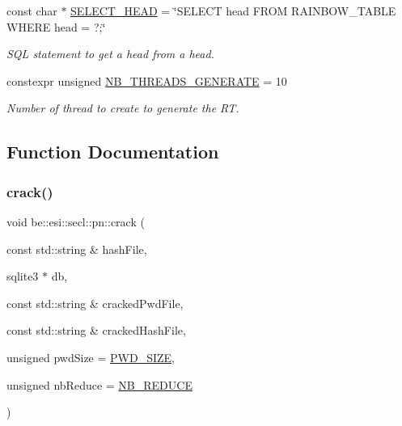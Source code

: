 \begin{DoxyCompactItemize}
const char $\ast$ \hyperlink{namespacebe_1_1esi_1_1secl_1_1pn_a90db4018123c098c9cd9205b69c1d2e5}{S\+E\+L\+E\+C\+T\+\_\+\+H\+E\+AD} = \char`\"{}S\+E\+L\+E\+CT head F\+R\+OM R\+A\+I\+N\+B\+O\+W\+\_\+\+T\+A\+B\+LE W\+H\+E\+RE head = ?;\char`\"{}
\begin{DoxyCompactList}\small\item\em S\+QL statement to get a head from a head. \end{DoxyCompactList}\item 
constexpr unsigned \hyperlink{namespacebe_1_1esi_1_1secl_1_1pn_a1e6f4ac9ec9002d783f3d7143062dcb5}{N\+B\+\_\+\+T\+H\+R\+E\+A\+D\+S\+\_\+\+G\+E\+N\+E\+R\+A\+TE} = 10
\begin{DoxyCompactList}\small\item\em Number of thread to create to generate the RT. \end{DoxyCompactList}\end{DoxyCompactItemize}


\subsection{Function Documentation}
\mbox{\label{namespacebe_1_1esi_1_1secl_1_1pn_a56fa00c405a4fb0e6446717fb1390493}} 
\subsubsection{\texorpdfstring{crack()}{crack()}}
{\footnotesize\ttfamily void be\+::esi\+::secl\+::pn\+::crack (\begin{DoxyParamCaption}\item[{const std\+::string \&}]{hash\+File,  }\item[{sqlite3 $\ast$}]{db,  }\item[{const std\+::string \&}]{cracked\+Pwd\+File,  }\item[{const std\+::string \&}]{cracked\+Hash\+File,  }\item[{unsigned}]{pwd\+Size = {\ttfamily \hyperlink{namespacebe_1_1esi_1_1secl_1_1pn_a233e474af3fb15b935a71709407307ec}{P\+W\+D\+\_\+\+S\+I\+ZE}},  }\item[{unsigned}]{nb\+Reduce = {\ttfamily \hyperlink{namespacebe_1_1esi_1_1secl_1_1pn_a712c184235263459041b774c8229fc1b}{N\+B\+\_\+\+R\+E\+D\+U\+CE}} }\end{DoxyParamCaption})}



